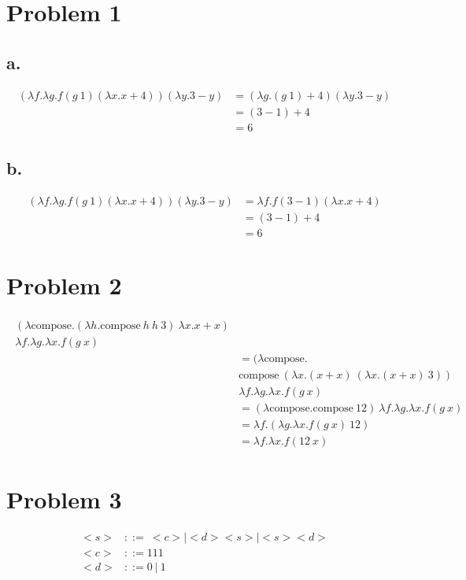 \documentclass[12pt, a4paper]{article}
\begin{document}
\section*{Problem 1}
\subsection*{a.}

\begin{align*}
		(\lambda f . \lambda g . f(g\ 1) (\lambda x . x + 4)) (\lambda y . 3 - y)
		&= (\lambda g . (g\ 1) + 4) (\lambda y . 3 - y) \\
		&= (3 - 1) + 4 \\
		&= 6
\end{align*}

\subsection*{b.}
\begin{align*}
		(\lambda f . \lambda g . f(g\ 1) (\lambda x . x + 4)) (\lambda y . 3 - y)
		&= \lambda f . f(3 - 1) (\lambda x . x + 4) \\
		&= (3 - 1) + 4 \\
		&= 6
\end{align*}


\section*{Problem 2}
\begin{align*}
\begin{split}
	(\lambda \text{compose} . (\lambda h . \text{compose}\ h\ h\ 3)\ \lambda x . x + x) \\
\lambda f . \lambda g . \lambda x . f(g\ x) \\
	&= (\lambda \text{compose} . \\
	& \text{compose}\ (\lambda x . (x + x)\ (\lambda x . (x + x)\ 3)) \\
	& \lambda f . \lambda g . \lambda x . f(g\ x) \\
	&= (\lambda \text{compose} . \text{compose}\ 12)\ \lambda f . \lambda g . \lambda x . f(g\ x) \\
	&= \lambda f . (\lambda g . \lambda x . f(g\ x)\ 12) \\
	&= \lambda f . \lambda x . f(12 \ x)
\end{split}
\end{align*}

\section*{Problem 3}
\begin{align*}
	<s> &::=\ <c> | <d><s> | <s><d> \\
	<c> &::= 111 \\
	<d> &::= 0\ |\ 1
\end{align*}
\end{document}
